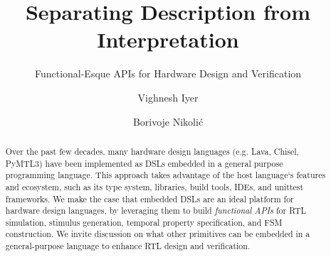 \documentclass[sigplan,review,nonacm,9pt]{acmart}
\begin{document}
\title{Separating Description from Interpretation}
\subtitle{Functional-Esque APIs for Hardware Design and Verification}

\author{Vighnesh Iyer}

\author{Borivoje Nikolić}



\begin{abstract}
Over the past few decades, many hardware design languages (e.g. Lava, Chisel, PyMTL3) have been implemented as DSLs embedded in a general purpose programming language.
This approach takes advantage of the host language`s features and ecosystem, such as its type system, libraries, build tools, IDEs, and unittest frameworks.
We make the case that embedded DSLs are an ideal platform for hardware design languages, by leveraging them to build \textit{functional APIs} for RTL simulation, stimulus generation, temporal property specification, and FSM construction.
We invite discussion on what other primitives can be embedded in a general-purpose language to enhance RTL design and verification.
\end{abstract}
\end{document}
